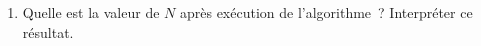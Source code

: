 \begin{enumerate}
\begin{enumerate}[label=\alph*.]
\begin{center}
                    \end{center}
                    \item Quelle est la valeur de $N$ après exécution de l'algorithme~? Interpréter ce
                    résultat.
               \end{enumerate}
          \end{enumerate}
          \medbreak

